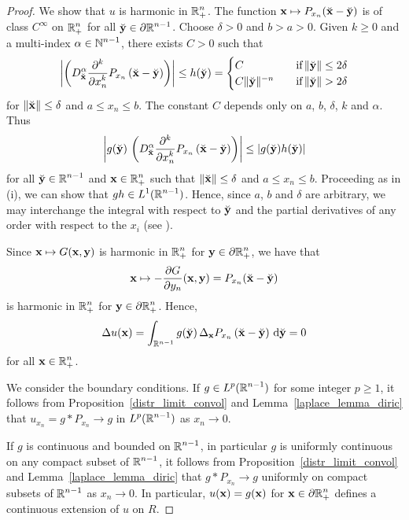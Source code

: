 \begin{proof}
 We show that $u$ is harmonic in $\displaystyle \RR^n_+$.
The function $\VEC{x} \mapsto P_{x_n}( \breve{\VEC{x}} - \breve{\VEC{y}} )$
is of class $\displaystyle C^\infty$ on $\displaystyle \RR^n_+$ for all
$\displaystyle \breve{\VEC{y}} \in \partial \RR^{n-1}$.
Choose $\delta>0$ and $b>a>0$.  Given $k\geq 0$ and a multi-index
$\displaystyle \alpha \in \NN^{n-1}$, there exists $C>0$ such that
\[
\left| \left( D^\alpha_{\breve{\VEC{x}}}
\pdfdxn{ P_{x_n}\left(\breve{\VEC{x}} - \breve{\VEC{y}}\right)}{x_n}{k} \right)
\right| 
\leq h(\breve{\VEC{y}}) =
\begin{cases}
C & \quad \text{if} \left\|\breve{\VEC{y}}\right\| \leq 2\delta \\
C\|\breve{\VEC{y}}\|^{-n} & \quad \text{if}
\left\|\breve{\VEC{y}}\right\| > 2\delta
\end{cases}
\]
for $\|\breve{\VEC{x}}\|\leq \delta$ and $a \leq x_n \leq b$.   The constant
$C$ depends only on $a$, $b$, $\delta$, $k$ and $\alpha$.  Thus
\[
\left|g(\breve{\VEC{y}})\, \left( D^\alpha_{\breve{\VEC{x}}}
\pdfdxn{ P_{x_n}\left(\breve{\VEC{x}} - \breve{\VEC{y}}\right)}{x_n}{k} \right)
\right| \leq \left|g(\breve{\VEC{y}})h(\breve{\VEC{y}})\right|
\]
for all $\displaystyle \breve{\VEC{y}} \in \RR^{n-1}$ and
$\displaystyle \VEC{x} \in \RR^n_+$ such that
$\|\breve{\VEC{x}}\|\leq \delta$ and $a \leq x_n \leq b$.  Proceeding
as in (i), we can show that $\displaystyle g h \in L^1(\RR^{n-1})$.
Hence, since $a$, $b$ and $\delta$ are arbitrary, we may interchange the
integral with respect to $\breve{\VEC{y}}$ and the partial
derivatives of any order with respect to the $x_i$ (see \cite{Flem}).

Since $\VEC{x} \mapsto G(\VEC{x}, \VEC{y})$ is harmonic in
$\displaystyle \RR^n_+$ for
$\displaystyle \VEC{y} \in \partial \RR^n_+$, we have that
\[
\VEC{x} \mapsto -\pdydx{G}{y_n}(\VEC{x},\VEC{y})
= P_{x_n}(\breve{\VEC{x}}-\breve{\VEC{y}})
\]
is harmonic in $\displaystyle \RR^n_+$ for
$\displaystyle \VEC{y} \in \partial \RR^n_+$.
Hence,
\[
\Delta u(\VEC{x}) = 
\int_{\RR^{n-1}} g(\breve{\VEC{y}})\,
\Delta_{\VEC{x}} P_{x_n}\left(\breve{\VEC{x}} - \breve{\VEC{y}}\right)
\dx{\breve{\VEC{y}}} = 0
\]
for all $\displaystyle \VEC{x} \in \RR^n_+$.

 We consider the boundary conditions.
If $\displaystyle g\in L^p(\RR^{n-1})$ for some integer $p \geq 1$, it
follows from Proposition~\ref{distr_limit_convol} and
Lemma~\ref{laplace_lemma_diric} that
$u_{x_n} = g \ast P_{x_n} \rightarrow g$ in $\displaystyle L^p(\RR^{n-1})$ as
$x_n \rightarrow 0$.

 If $g$ is continuous and bounded on $\displaystyle \RR^{n-1}$, in
particular $g$ is uniformly continuous on any compact subset of
$\displaystyle \RR^{n-1}$, it follows from
Proposition~\ref{distr_limit_convol} and
Lemma~\ref{laplace_lemma_diric} that
$g \ast P_{x_n} \rightarrow g$ uniformly on compact subsets of
$\displaystyle \RR^{n-1}$ as $x_n \rightarrow 0$.  In particular,
$u(\VEC{x}) = g(\VEC{x})$ for
$\displaystyle \VEC{x} \in \partial \RR^n_+$ defines a
continuous extension of $u$ on $R$.
\end{proof}

